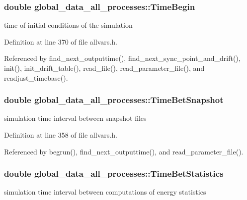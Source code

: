 \hypertarget{structglobal__data__all__processes_ad671e0af15abea094631b996dc78c8f1}{
\subsubsection[{TimeBegin}]{\setlength{\rightskip}{0pt plus 5cm}double {\bf global\_\-data\_\-all\_\-processes::TimeBegin}}}
\label{structglobal__data__all__processes_ad671e0af15abea094631b996dc78c8f1}
time of initial conditions of the simulation 

Definition at line 370 of file allvars.h.



Referenced by find\_\-next\_\-outputtime(), find\_\-next\_\-sync\_\-point\_\-and\_\-drift(), init(), init\_\-drift\_\-table(), read\_\-file(), read\_\-parameter\_\-file(), and readjust\_\-timebase().

\hypertarget{structglobal__data__all__processes_a0c02c06bb5214dcf72dd4eb757df8ad3}{
\subsubsection[{TimeBetSnapshot}]{\setlength{\rightskip}{0pt plus 5cm}double {\bf global\_\-data\_\-all\_\-processes::TimeBetSnapshot}}}
\label{structglobal__data__all__processes_a0c02c06bb5214dcf72dd4eb757df8ad3}
simulation time interval between snapshot files 

Definition at line 358 of file allvars.h.



Referenced by begrun(), find\_\-next\_\-outputtime(), and read\_\-parameter\_\-file().

\hypertarget{structglobal__data__all__processes_a516be9ff5c4fd4171aa8e1a687e1e72d}{
\subsubsection[{TimeBetStatistics}]{\setlength{\rightskip}{0pt plus 5cm}double {\bf global\_\-data\_\-all\_\-processes::TimeBetStatistics}}}
\label{structglobal__data__all__processes_a516be9ff5c4fd4171aa8e1a687e1e72d}
simulation time interval between computations of energy statistics 

